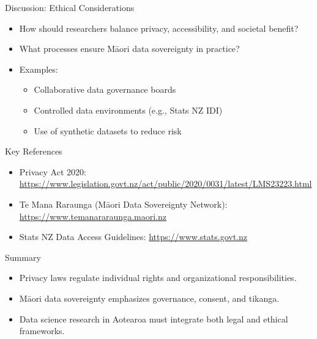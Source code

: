 \documentclass[
  12pt,
  ignorenonframetext,
]{beamer}
\providecommand{\tightlist}{%
  \setlength{\itemsep}{0pt}\setlength{\parskip}{0pt}}\usepackage{longtable,booktabs,array}
\begin{document}
\begin{frame}{Discussion: Ethical Considerations}
\label{discussion-ethical-considerations}
\begin{itemize}
\tightlist
\item
  How should researchers balance privacy, accessibility, and societal
  benefit?
\item
  What processes ensure Māori data sovereignty in practice?
\item
  Examples:

  \begin{itemize}
  \tightlist
  \item
    Collaborative data governance boards
  \item
    Controlled data environments (e.g., Stats NZ IDI)
  \item
    Use of synthetic datasets to reduce risk
  \end{itemize}
\end{itemize}
\end{frame}

\begin{frame}{Key References}
\label{key-references}
\begin{itemize}
\tightlist
\item
  Privacy Act 2020:
  \url{https://www.legislation.govt.nz/act/public/2020/0031/latest/LMS23223.html}
\item
  Te Mana Raraunga (Māori Data Sovereignty Network):
  \url{https://www.temanararaunga.maori.nz}
\item
  Stats NZ Data Access Guidelines: \url{https://www.stats.govt.nz}
\end{itemize}
\end{frame}

\begin{frame}{Summary}
\label{summary}
\begin{itemize}
\tightlist
\item
  Privacy laws regulate individual rights and organizational
  responsibilities.
\item
  Māori data sovereignty emphasizes governance, consent, and tikanga.
\item
  Data science research in Aotearoa must integrate both legal and
  ethical frameworks.
\end{itemize}
\end{frame}
\end{document}
